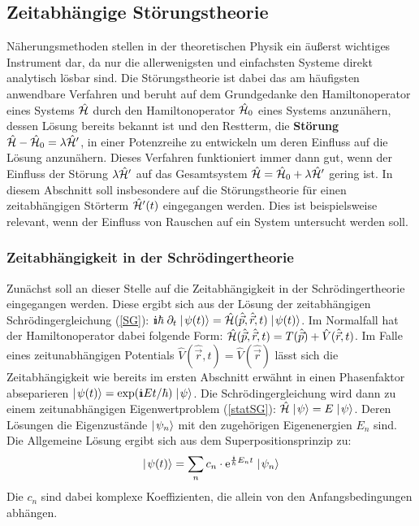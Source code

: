 %
%
%

\subsection{Zeitabhängige Störungstheorie}
Näherungsmethoden stellen in der theoretischen Physik ein äußerst wichtiges Instrument dar, da nur die allerwenigsten und einfachsten Systeme direkt analytisch lösbar sind. Die Störungstheorie ist dabei das am häufigsten anwendbare Verfahren und beruht auf dem Grundgedanke den Hamiltonoperator eines Systems $\hat{\mathcal H}$ durch den Hamiltonoperator $\hat{\mathcal H}_0$ eines Systems anzunähern, dessen Lösung bereits bekannt ist und den Restterm, die {\bf Störung} $\hat{\mathcal H}-\hat{\mathcal H}_0=\lambda\hat{\mathcal H}'$, in einer Potenzreihe zu entwickeln um deren Einfluss auf die Lösung anzunähern. Dieses Verfahren funktioniert immer dann gut, wenn der Einfluss der Störung $\lambda\hat{\mathcal H}'$ auf das Gesamtsystem $\hat{\mathcal H}=\hat{\mathcal H}_0+\lambda\hat{\mathcal H}'$ gering ist. In diesem Abschnitt soll insbesondere auf die Störungstheorie für einen zeitabhängigen Störterm $\hat{\mathcal H}'(t)$ eingegangen werden. Dies ist beispielsweise relevant, wenn der Einfluss von Rauschen auf ein System untersucht werden soll. 

\subsubsection{Zeitabhängigkeit in der Schrödingertheorie}
Zunächst soll an dieser Stelle auf die Zeitabhängigkeit in der Schrödingertheorie eingegangen werden. Diese ergibt sich aus der Lösung der zeitabhängigen Schrödingergleichung (\ref{SG}): $\I\hbar\;\partial_t\ket{\psi(t)}=\hat{\ham}(\hat{\vec{p}},\hat{\vec{r}},t)\ket{\psi(t)}$. Im Normalfall hat der Hamiltonoperator dabei folgende Form: $\hat{\mathcal H}(\hat{\vec{p}},\hat{\vec{r}},t) = T(\hat{\vec{p}}) + \hat{V}(\hat{\vec{r}},t)$. Im Falle eines zeitunabhängigen Potentials $\hat{V}(\hat{\vec{r}},t)=\hat{V}(\hat{\vec{r}})$ lässt sich die Zeitabhängigkeit wie bereits im ersten Abschnitt erwähnt in einen Phasenfaktor abseparieren $\ket{\psi(t)}=\exp(\I E t/\hbar)\ket{\psi}$. Die Schrödingergleichung wird dann zu einem zeitunabhängigen Eigenwertproblem (\ref{statSG}): $\hat{\mathcal H}\mid\!\!\!\,\,{\psi}\rangle=E\mid\!\!\!\,\,{\psi}\rangle$. Deren Lösungen die Eigenzustände $\mid\!\!\!\,\,{\psi_n}\rangle$ mit den zugehörigen Eigenenergien $E_n$ sind. Die Allgemeine Lösung ergibt sich aus dem Superpositionsprinzip zu: 
\begin{eqnarray*}
	\ket{\psi(t)} = \sum_n c_n\cdot \e^{\frac{\I}{\hbar}E_n t}\ket{\psi_n}
\end{eqnarray*}
Die $c_n$ sind dabei komplexe Koeffizienten, die allein von den Anfangsbedingungen abhängen. 

